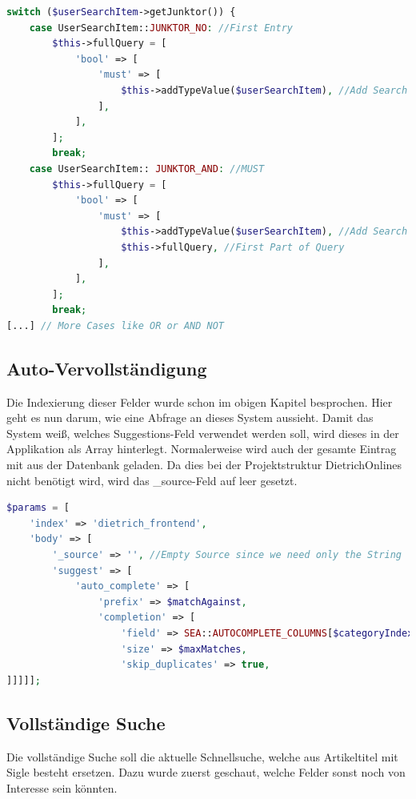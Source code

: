 \begin{lstlisting}[language=PHP, frame=single, label={lst:booleanEla}] 
switch ($userSearchItem->getJunktor()) {
    case UserSearchItem::JUNKTOR_NO: //First Entry
        $this->fullQuery = [
            'bool' => [
                'must' => [
                    $this->addTypeValue($userSearchItem), //Add Search
                ],
            ],
        ];
        break;
    case UserSearchItem:: JUNKTOR_AND: //MUST
        $this->fullQuery = [
            'bool' => [
                'must' => [
                    $this->addTypeValue($userSearchItem), //Add Search
                    $this->fullQuery, //First Part of Query
                ],
            ],
        ];
        break;
[...] // More Cases like OR or AND NOT
\end{lstlisting}

\subsection{Auto-Vervollständigung}

Die Indexierung dieser Felder wurde schon im obigen Kapitel besprochen. Hier geht es nun darum, wie eine Abfrage an dieses System aussieht. Damit das System weiß, welches Suggestions-Feld verwendet werden soll, wird dieses in der Applikation als Array hinterlegt. Normalerweise wird auch der gesamte Eintrag mit aus der Datenbank geladen. Da dies bei der Projektstruktur DietrichOnlines nicht benötigt wird, wird das \_source-Feld auf leer gesetzt.


\begin{lstlisting}[language=PHP, frame=single, label={lst:autocompleParams}] 
$params = [
    'index' => 'dietrich_frontend',
    'body' => [
        '_source' => '', //Empty Source since we need only the String
        'suggest' => [
            'auto_complete' => [
                'prefix' => $matchAgainst,
                'completion' => [
                    'field' => SEA::AUTOCOMPLETE_COLUMNS[$categoryIndex],
                    'size' => $maxMatches,
                    'skip_duplicates' => true,
]]]]];
\end{lstlisting}

\subsection{Vollständige Suche}

Die vollständige Suche soll die aktuelle Schnellsuche, welche aus Artikeltitel mit Sigle besteht ersetzen. Dazu wurde zuerst geschaut, welche Felder sonst noch von Interesse sein könnten. 

